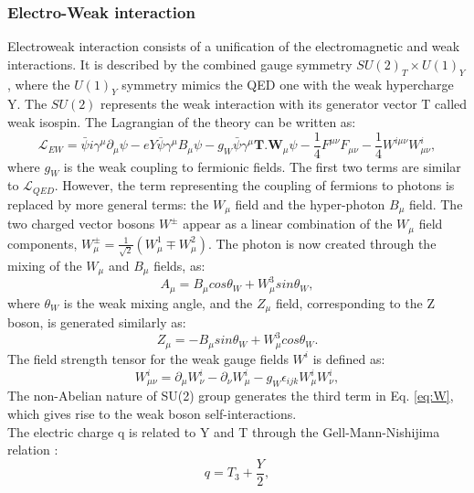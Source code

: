 \subsubsection{Electro-Weak interaction}
Electroweak interaction consists of a unification of the electromagnetic and weak interactions. It is described by the combined gauge symmetry $SU(2)_{T}\times U(1)_{Y}$, where the $U(1)_{Y}$ symmetry mimics the QED one with the weak hypercharge Y. The $SU(2)$ represents the weak interaction with its generator vector T called weak isospin. The Lagrangian of the theory can be written as: 
\begin{equation}
    \mathcal{L}_{EW} = \bar{\psi}i\gamma^\mu\partial_\mu\psi -eY\bar{\psi}\gamma^{\mu}B_{\mu}\psi-g_{W}\bar{\psi}\gamma^{\mu}\textbf{T.W$_\mu$}\psi
    -\frac{1}{4}F^{\mu\nu}F_{\mu\nu} - \frac{1}{4}W^{i\mu\nu}W^i_{\mu\nu},
\end{equation}
where $g_{W}$ is the weak coupling to fermionic fields. The first two terms are similar to $\mathcal{L}_{QED}$. However, the term representing the coupling of fermions to photons is replaced by more general terms: the $W_{\mu}$ field and the hyper-photon $B_{\mu}$ field. The two charged vector bosons $W^\pm$ appear as a linear combination of the $W_{\mu}$ field components, $W^{\pm}_{\mu} = \frac{1}{\sqrt{2}}(W^1_{\mu}\mp W^2_{\mu})$. The photon is now created through the mixing of the $W_{\mu}$ and $B_{\mu}$ fields, as:
\begin{equation}
    A_{\mu} = B_{\mu}cos\theta_{W} + W^3_{\mu}sin\theta_{W},
\end{equation}
where $\theta_{W}$ is the weak mixing angle, and the $Z_{\mu}$ field, corresponding to the Z boson, is generated similarly as: 
\begin{equation}
     Z_{\mu} = -B_{\mu}sin\theta_{W} + W^3_{\mu}cos\theta_{W}.
\end{equation}
The field strength tensor for the weak gauge fields $W^i$ is defined as:
\begin{equation}
    W^{i}_{\mu\nu} = \partial_{\mu}W^i_{\nu} - \partial_{\nu}W^i_{\mu} - g_{W}\epsilon_{ijk}W^i_{\mu}W^i_{\nu},
    \label{eq:W}
\end{equation}
The non-Abelian nature of SU(2) group generates the third term in Eq. \ref{eq:W}, which gives rise to the weak boson self-interactions. \\
The electric charge q is related to Y and T through the Gell-Mann-Nishijima relation \cite{Gell}:
\begin{equation}
    q = T_3 + \frac{Y}{2},
\end{equation}
